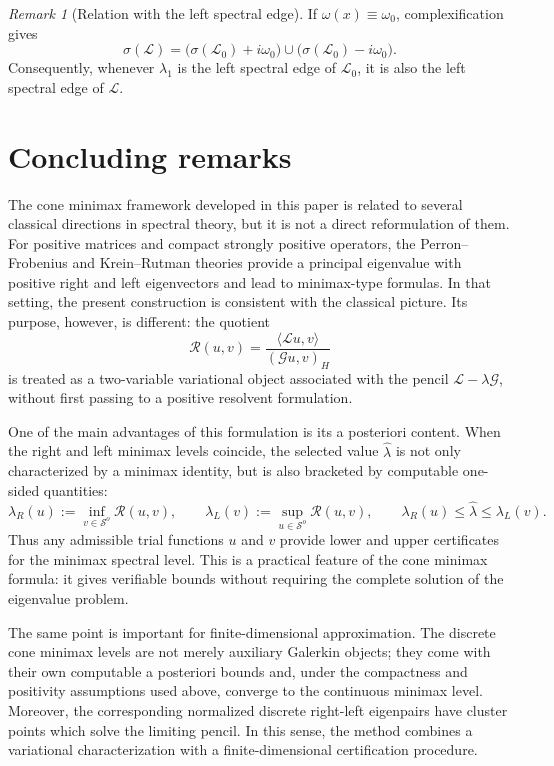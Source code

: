 \documentclass[preprint,10pt]{elsarticle}
\theoremstyle{plain}
\theoremstyle{definition}
\theoremstyle{remark}
\newtheorem{remark}{Remark}
\begin{document}
\begin{remark}[Relation with the left spectral edge]
	If $\omega(x)\equiv\omega_0$, complexification gives
	\[
	\sigma(\mathcal L)
	=
	\bigl(\sigma(\mathcal L_0)+i\omega_0\bigr)
	\cup\bigl(\sigma(\mathcal L_0)-i\omega_0\bigr).
	\]
	Consequently, whenever $\lambda_1$ is the left spectral edge of
	$\mathcal L_0$, it is also the left spectral edge of $\mathcal L$.
\end{remark}

\medskip
	

	

\section{Concluding remarks}

The cone minimax framework developed in this paper is related to several
classical directions in spectral theory, but it is not a direct
reformulation of them. For positive matrices and compact strongly positive
operators, the Perron--Frobenius and Krein--Rutman theories provide a
principal eigenvalue with positive right and left eigenvectors and lead to
minimax-type formulas. In that setting, the present construction is
consistent with the classical picture. Its purpose, however, is different:
the quotient
\[
\mathcal R(u,v)
=
\frac{\langle\mathcal L u,v\rangle}{(\mathcal G u,v)_H}
\]
is treated as a two-variable variational object associated with the pencil
\(\mathcal L-\lambda\mathcal G\), without first passing to a positive
resolvent formulation.

One of the main advantages of this formulation is its a posteriori content.
When the right and left minimax levels coincide, the selected value
\(\hat\lambda\) is not only characterized by a minimax identity, but is also
bracketed by computable one-sided quantities:
\[
\lambda_R(u)
:=
\inf_{v\in\mathcal S^o}\mathcal R(u,v),
\qquad
\lambda_L(v)
:=
\sup_{u\in\mathcal S^o}\mathcal R(u,v),
\qquad
\lambda_R(u)\le \hat\lambda\le \lambda_L(v).
\]
Thus any admissible trial functions \(u\) and \(v\) provide lower and upper
certificates for the minimax spectral level. This is a practical feature of
the cone minimax formula: it gives verifiable bounds without requiring the
complete solution of the eigenvalue problem.

The same point is important for finite-dimensional approximation. The
discrete cone minimax levels are not merely auxiliary Galerkin objects; they
come with their own computable a posteriori bounds and, under the compactness
and positivity assumptions used above, converge to the continuous minimax
level. Moreover, the corresponding normalized discrete right-left eigenpairs
have cluster points which solve the limiting pencil. In this sense, the
method combines a variational characterization with a finite-dimensional
certification procedure.
\end{document}
